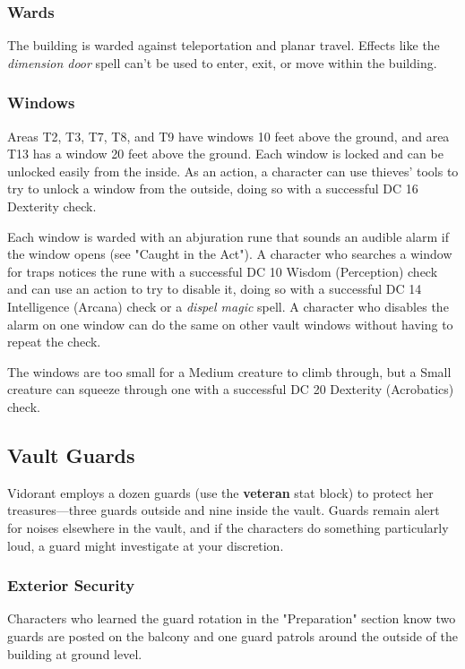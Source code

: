 \documentclass[10pt,a4paper,twoside,bg=print,twocolumn,openany,nodeprecatedcode]{dndbook}
\begin{document}
\subsubsection{Wards}
The building is warded against teleportation and planar travel. Effects like the \textit{dimension door} spell can't be used to enter, exit, or move within the building.

\subsubsection{Windows}
Areas T2, T3, T7, T8, and T9 have windows 10 feet above the ground, and area T13 has a window 20 feet above the ground. Each window is locked and can be unlocked easily from the inside. As an action, a character can use thieves' tools to try to unlock a window from the outside, doing so with a successful DC 16 Dexterity check.

Each window is warded with an abjuration rune that sounds an audible alarm if the window opens (see "Caught in the Act"). A character who searches a window for traps notices the rune with a successful DC 10 Wisdom (Perception) check and can use an action to try to disable it, doing so with a successful DC 14 Intelligence (Arcana) check or a \textit{dispel magic} spell. A character who disables the alarm on one window can do the same on other vault windows without having to repeat the check.

The windows are too small for a Medium creature to climb through, but a Small creature can squeeze through one with a successful DC 20 Dexterity (Acrobatics) check.

\subsection{Vault Guards}
Vidorant employs a dozen guards (use the \textbf{veteran} stat block) to protect her treasures—three guards outside and nine inside the vault. Guards remain alert for noises elsewhere in the vault, and if the characters do something particularly loud, a guard might investigate at your discretion.

\subsubsection{Exterior Security}
Characters who learned the guard rotation in the "Preparation" section know two guards are posted on the balcony and one guard patrols around the outside of the building at ground level.
\end{document}
